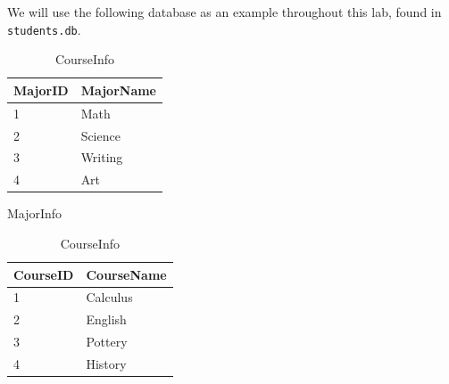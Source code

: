 
We will use the following database as an example throughout this lab, found in \texttt{students.db}.

\begin{table}[H]
\begin{subtable}{0.55\textwidth}
    \centering
    \begin{subtable}{.45\textwidth}
        \centering
        \footnotesize
        \begin{tabular}{|l|l|}
            \hline MajorID & MajorName \\ \hline
            1 & Math \\
            2 & Science \\
            3 & Writing \\
            4 & Art \\ \hline
        \end{tabular}
        \caption{MajorInfo}
        \label{table:sql1-student-majorinfo}
    \end{subtable}
    \hfil
    \begin{subtable}{.45\textwidth}
        \centering
        \footnotesize
        \begin{tabular}{|l|l|}
            \hline CourseID & CourseName \\ \hline
            1 & Calculus \\
            2 & English \\
            3 & Pottery \\
            4 & History \\ \hline
        \end{tabular}
        \caption{CourseInfo}
        \label{table:sql1-student-courseinfo}
    \end{subtable}
    \\[1.em] %
    \begin{subtable}{\textwidth}

\end{subtable}
\end{subtable}
\end{table}
